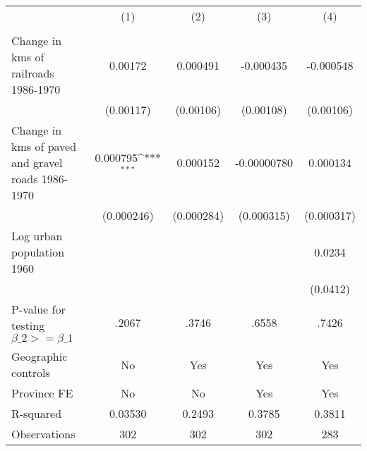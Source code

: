 {
\def\sym#1{\ifmmode^{#1}\else\(^{#1}\)\fi}
\begin{tabular}{l*{4}{c}}
\hline\hline
                &\multicolumn{1}{c}{(1)}&\multicolumn{1}{c}{(2)}&\multicolumn{1}{c}{(3)}&\multicolumn{1}{c}{(4)}\\
                &\multicolumn{1}{c}{}&\multicolumn{1}{c}{}&\multicolumn{1}{c}{}&\multicolumn{1}{c}{}\\
\hline
Change in kms of railroads 1986-1970&  0.00172         & 0.000491         &-0.000435         &-0.000548         \\
                &(0.00117)         &(0.00106)         &(0.00108)         &(0.00106)         \\
[1em]
Change in kms of paved and gravel roads 1986-1970& 0.000795\sym{***}& 0.000152         &-0.00000780         & 0.000134         \\
                &(0.000246)         &(0.000284)         &(0.000315)         &(0.000317)         \\
[1em]
Log urban population 1960&                  &                  &                  &   0.0234         \\
                &                  &                  &                  & (0.0412)         \\
\hline
P-value for testing $\beta\_{2} >= \beta\_{1}$&    .2067         &    .3746         &    .6558         &    .7426         \\
Geographic controls&       No         &      Yes         &      Yes         &      Yes         \\
Province FE     &       No         &       No         &      Yes         &      Yes         \\
R-squared       &  0.03530         &   0.2493         &   0.3785         &   0.3811         \\
Observations    &      302         &      302         &      302         &      283         \\
\hline\hline
\end{tabular}
}
